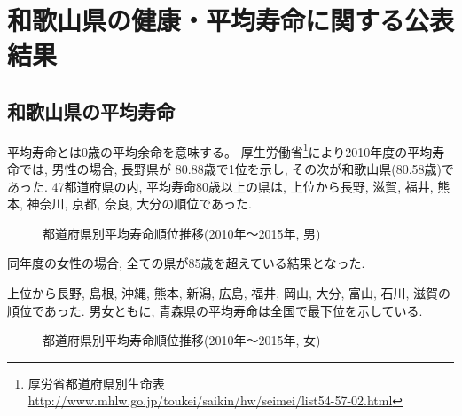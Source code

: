 \chapter{
和歌山県の健康・平均寿命に関する公表結果}




\section{和歌山県の平均寿命}
平均寿命とは0歳の平均余命を意味する。
厚生労働省\footnote{
	厚労省都道府県別生命表
	\url{http://www.mhlw.go.jp/toukei/saikin/hw/seimei/list54-57-02.html}}により2010年度の平均寿命では,
男性の場合, 長野県が 80.88歳で1位を示し, その次が和歌山県(80.58歳)であった. 47都道府県の内, 平均寿命80歳以上の県は,
上位から長野, 滋賀,  福井, 熊本,  神奈川,   京都,   奈良,   大分の順位であった.

\begin{figure}[h!]
	\begin{center}
		\caption{都道府県別平均寿命順位推移(2010年〜2015年, 男)}
	\end{center}
\end{figure}


同年度の女性の場合, 全ての県が85歳を超えている結果となった.

上位から長野, 島根, 沖縄, 熊本, 新潟, 広島, 福井, 岡山, 大分, 富山, 石川, 滋賀の順位であった.
男女ともに, 青森県の平均寿命は全国で最下位を示している.
\begin{figure}[h!]
	\begin{center}
		\caption{都道府県別平均寿命順位推移(2010年〜2015年, 女)}\end{center}
\end{figure}






